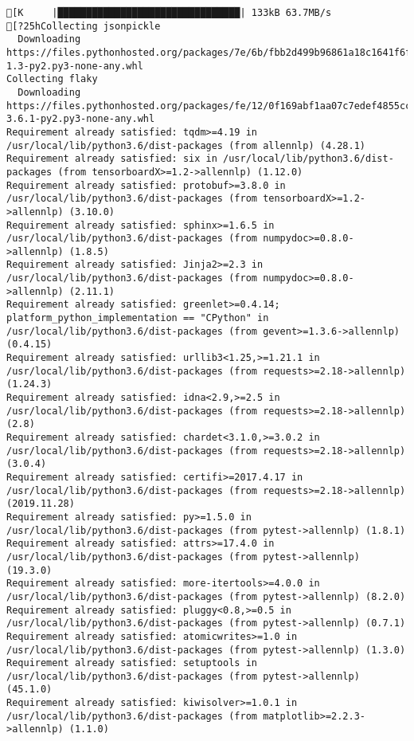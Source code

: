 \documentclass[
]{article}
\begin{document}
\begin{verbatim}
[K     |████████████████████████████████| 133kB 63.7MB/s 
[?25hCollecting jsonpickle
  Downloading https://files.pythonhosted.org/packages/7e/6b/fbb2d499b96861a18c1641f6fefe775110d3faba65c1524950e9ad64824a/jsonpickle-1.3-py2.py3-none-any.whl
Collecting flaky
  Downloading https://files.pythonhosted.org/packages/fe/12/0f169abf1aa07c7edef4855cca53703d2e6b7ecbded7829588ac7e7e3424/flaky-3.6.1-py2.py3-none-any.whl
Requirement already satisfied: tqdm>=4.19 in /usr/local/lib/python3.6/dist-packages (from allennlp) (4.28.1)
Requirement already satisfied: six in /usr/local/lib/python3.6/dist-packages (from tensorboardX>=1.2->allennlp) (1.12.0)
Requirement already satisfied: protobuf>=3.8.0 in /usr/local/lib/python3.6/dist-packages (from tensorboardX>=1.2->allennlp) (3.10.0)
Requirement already satisfied: sphinx>=1.6.5 in /usr/local/lib/python3.6/dist-packages (from numpydoc>=0.8.0->allennlp) (1.8.5)
Requirement already satisfied: Jinja2>=2.3 in /usr/local/lib/python3.6/dist-packages (from numpydoc>=0.8.0->allennlp) (2.11.1)
Requirement already satisfied: greenlet>=0.4.14; platform_python_implementation == "CPython" in /usr/local/lib/python3.6/dist-packages (from gevent>=1.3.6->allennlp) (0.4.15)
Requirement already satisfied: urllib3<1.25,>=1.21.1 in /usr/local/lib/python3.6/dist-packages (from requests>=2.18->allennlp) (1.24.3)
Requirement already satisfied: idna<2.9,>=2.5 in /usr/local/lib/python3.6/dist-packages (from requests>=2.18->allennlp) (2.8)
Requirement already satisfied: chardet<3.1.0,>=3.0.2 in /usr/local/lib/python3.6/dist-packages (from requests>=2.18->allennlp) (3.0.4)
Requirement already satisfied: certifi>=2017.4.17 in /usr/local/lib/python3.6/dist-packages (from requests>=2.18->allennlp) (2019.11.28)
Requirement already satisfied: py>=1.5.0 in /usr/local/lib/python3.6/dist-packages (from pytest->allennlp) (1.8.1)
Requirement already satisfied: attrs>=17.4.0 in /usr/local/lib/python3.6/dist-packages (from pytest->allennlp) (19.3.0)
Requirement already satisfied: more-itertools>=4.0.0 in /usr/local/lib/python3.6/dist-packages (from pytest->allennlp) (8.2.0)
Requirement already satisfied: pluggy<0.8,>=0.5 in /usr/local/lib/python3.6/dist-packages (from pytest->allennlp) (0.7.1)
Requirement already satisfied: atomicwrites>=1.0 in /usr/local/lib/python3.6/dist-packages (from pytest->allennlp) (1.3.0)
Requirement already satisfied: setuptools in /usr/local/lib/python3.6/dist-packages (from pytest->allennlp) (45.1.0)
Requirement already satisfied: kiwisolver>=1.0.1 in /usr/local/lib/python3.6/dist-packages (from matplotlib>=2.2.3->allennlp) (1.1.0)

\end{verbatim}
\end{document}

